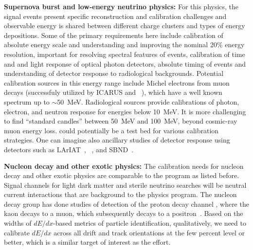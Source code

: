 \textbf{Supernova burst and low-energy neutrino physics:} For this physics, the signal events present specific reconstruction and calibration challenges and observable energy is shared between different charge clusters and types of energy depositions. Some of the primary requirements here include calibration of absolute energy scale and 
understanding and improving the nominal 20\% energy resolution, important for resolving spectral features of  events,
calibration of time and and light response of optical photon detectors, absolute timing of events and understanding of detector response to radiological backgrounds. Potential calibration sources in this energy range include Michel electrons from muon decays (successfuly utilized by ICARUS and ~\cite{Acciarri:2017sjy}), which have a well known spectrum up to $\sim$50~MeV. Radiological sources provide calibrations of photon, electron, and neutron response for energies below \SI{10}{\MeV}. It is more challenging to find ``standard candles'' between 50~MeV and \SI{100}{\MeV}, beyond cosmic-ray muon energy loss.  could potentially be a test bed for various calibration strategies. One can imagine also ancillary studies of detector response using detectors such as LArIAT~\cite{Cavanna:2014iqa}, ~\cite{Acciarri:2016smi}, and SBND~\cite{Antonello:2015lea}. %

\textbf{Nucleon decay and other exotic physics:} The calibration needs for nucleon decay and other exotic physics are comparable to the  program as listed before. Signal channels for light dark matter and sterile neutrino searches will be neutral current interactions that are background to the  physics program. The nucleon decay group has done studies of detection of the proton decay channel \ptoknubar, %
where the kaon decays to a muon, which subsequently decays to a positron~\cite{protondecaywidths}. Based on the widths of $dE/dx$-based metrics of particle identification, qualitatively, we need to calibrate $dE/dx$ across all drift and track orientations at the few percent level or better, which is a similar target of interest as the  effort.


